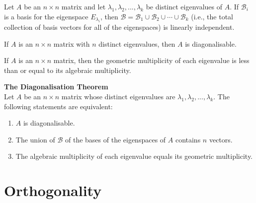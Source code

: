\documentclass{article}
\begin{document}
\begin{theorem}
    Let $A$ be an $n\times n$ matrix and let $\lambda_1, \lambda_2, ..., \lambda_k$ be distinct eigenvalues of $A$. If $\mathcal{B}_i$ is a basis for the eigenspace $E_{\lambda_i}$, then $\mathcal{B} = \mathcal{B}_1\cup\mathcal{B}_2\cup\cdots\cup\mathcal{B}_k$ (i.e., the total collection of basis vectors for all of the eigenspaces) is linearly independent.
\end{theorem}
\begin{theorem}
    If $A$ is an $n\times n$ matrix with $n$ distinct eigenvalues, then $A$ is diagonalisable.
\end{theorem}
\begin{theorem}
    If $A$ is an $n\times n$ matrix, then the geometric multiplicity of each eigenvalue is less than or equal to its algebraic multiplicity.
\end{theorem}
\begin{theorem}
    \textbf{The Diagonalisation Theorem}\\
    Let $A$ be an $n\times n$ matrix whose distinct eigenvalues are $\lambda_1, \lambda_2, ...,\lambda_k$. The following statements are equivalent:
    \begin{enumerate}
        \item $A$ is diagonalisable.
        \item The union of $\mathcal{B}$ of the bases of the eigenspaces of $A$ contains $n$ vectors.
        \item The algebraic multiplicity of each eigenvalue equals its geometric multiplicity.
    \end{enumerate}

\end{theorem}
\section{Orthogonality}
\end{document}
